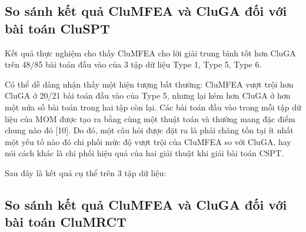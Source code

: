 \subsection{So sánh kết quả CluMFEA và CluGA đối với bài toán CluSPT}
Kết quả thực nghiệm cho thấy CluMFEA cho lời giải trung bình tốt hơn CluGA trên 48/85 bài toán đầu vào của 3 tập dữ liệu Type 1, Type 5, Type 6. 

Có thể dễ dàng nhận thấy một hiện tượng bất thường: CluMFEA vượt trội hơn CluGA ở 20/21 bài toán đầu vào của Type 5, nhưng lại kém hơn CluGA ở hơn một nửa số bài toán trong hai tập còn lại. Các bài toán đầu vào trong mỗi tập dữ liệu của MOM được tạo ra bằng cùng một thuật toán và thường mang đặc điểm chung nào đó [10]. Do đó, một câu hỏi được đặt ra là phải chăng tồn tại ít nhất một yếu tố nào đó chi phối mức độ vượt trội của CluMFEA so với CluGA, hay nói cách khác là chi phối hiệu quả của hai giải thuật khi giải bài toán CSPT.
 
Sau đây là kết quả  cụ thể trên 3 tập dữ liệu:   


\subsection{So sánh kết quả CluMFEA và CluGA đối với bài toán CluMRCT}

